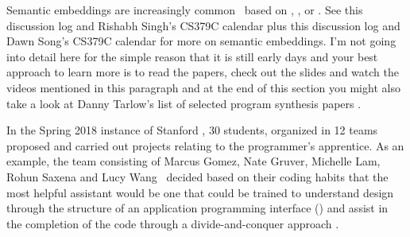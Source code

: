 Semantic embeddings are increasingly common~\cite{DevlinetalICLR-18,ChistyakovetalICLR-17,WangetalCoRR-17,XuetalCoRR-17,PiechetalICML-15} based on {}, {}, or {}. See this discussion log {} and Rishabh Singh's CS379C calendar {} plus this discussion log {} and Dawn Song's CS379C calendar {} for more on semantic embeddings. I'm not going into detail here for the simple reason that it is still early days and your best approach to learn more is to read the papers, check out the slides and watch the videos mentioned in this paragraph and at the end of this section \emdash{} you might also take a look at Danny Tarlow's list of selected program synthesis papers {}.




In the Spring 2018 instance of Stanford {}, 30 students, organized in 12 teams proposed and carried out projects relating to the programmer's apprentice. As an example, the team consisting of Marcus Gomez, Nate Gruver, Michelle Lam, Rohun Saxena and Lucy Wang~\cite{CS379C_Final_Project_Gomezetal-18} decided based on their coding habits that the most helpful assistant would be one that could be trained to understand design through the structure of an application programming interface ({}) and assist in the completion of the code through a divide-and-conquer approach {}.


